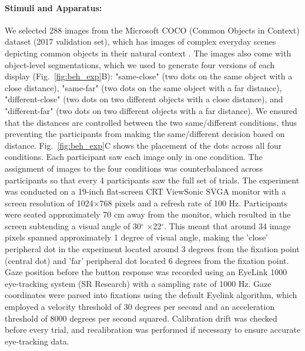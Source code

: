 \documentclass{article}
\begin{document}
\paragraph{Stimuli and Apparatus:}
We selected 288 images from the Microsoft COCO (Common Objects in Context) dataset (2017 validation set), which has images of complex everyday scenes depicting common objects in their natural context \citep{lin2014microsoft}. The images also come with object-level segmentations, which we used to generate four versions of each display (Fig.~\ref{fig:beh_exp}B): "same-close" (two dots on the same object with a close distance), "same-far" (two dots on the same object with a far distance), "different-close" (two dots on two different objects with a close distance), and "different-far" (two dots on two different objects with a far distance). We ensured that the distances are controlled between the two same/different conditions, thus preventing the participants from making the same/different decision based on distance. Fig.~\ref{fig:beh_exp}C shows the placement of the dots across all four conditions. Each participant saw each image only in one condition. The assignment of images to the four conditions was counterbalanced across participants so that every 4 participants saw the full set of trials. The experiment was conducted on a 19-inch flat-screen CRT ViewSonic SVGA monitor with a screen resolution of 1024×768 pixels and a refresh rate of 100 Hz. Participants were seated approximately 70 cm away from the monitor, which resulted in the screen subtending a visual angle of 30$^\circ$ ×22$^\circ$. This meant that around 34 image pixels spanned approximately 1 degree of visual angle, making the 'close' peripheral dot in the experiment located around 3 degrees from the fixation point (central dot) and 'far' peripheral dot located 6 degrees from the fixation point. Gaze position before the button response was recorded using an EyeLink 1000 eye-tracking system (SR Research) with a sampling rate of 1000 Hz. Gaze coordinates were parsed into fixations using the default Eyelink algorithm, which employed a velocity threshold of 30 degrees per second and an acceleration threshold of 8000 degrees per second squared. Calibration drift was checked before every trial, and recalibration was performed if necessary to ensure accurate eye-tracking data. 
\end{document}
